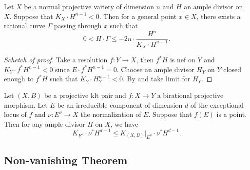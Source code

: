     \begin{proposition}\label{prop:general_rational_curve_on_klt_variety_with_negative_intersection}
        Let \(X\) be a normal projective variety of dimension \(n\) and \(H\) an ample divisor on \(X\).
        Suppose that \(K_X\cdot H^{n-1} < 0\).
        Then for a general point \(x\in X\), there exists a rational curve \(\Gamma\) passing through \(x\) such that
        \[ 0 < H \cdot \Gamma \leq - 2n \cdot \frac{H^n}{K_X \cdot H^{n-1}}. \]
    \end{proposition}
    \begin{proof}[Schetch of proof]
        Take a resolution \(f:Y \to X\), then \(f^*H\) is nef on \(Y\) and \(K_Y\cdot f^*H^{n-1} < 0\) since \(E \cdot f^*H^{n-1} = 0\).
        Choose an ample divisor \(H_Y\) on \(Y\) closed enough to \(f^*H\) such that \(K_Y \cdot H_Y^{n-1} < 0\).
        By \cite[Theorem 5]{MM86} and take limit for \(H_Y\).
    \end{proof}

    \begin{lemma}\label{lem:the_pair_controls_the_exceptional_locus}
        Let \((X,B)\) be a projective klt pair and \(f:X \to Y\) a birational projective morphism.
        Let \(E\) be an irreducible component of dimension \(d\) of the exceptional locus of \(f\) and \(\nu:E^\nu \to X\) the normalization of \(E\).
        Suppose that \(f(E)\) is a point.
        Then for any ample divisor \(H\) on \(X\), we have
        \[ K_{E^\nu}\cdot \nu^*H^{d-1} \leq K_{(X,B)}|_{E^\nu}\cdot \nu^*H^{d-1}. \]
    \end{lemma}


\subsection{Non-vanishing Theorem}

